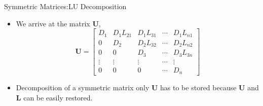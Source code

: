 \documentclass{beamer}
\begin{document}
\begin{frame}{Symmetric Matrices:LU Decomposition}
  \begin{itemize}
  \item We arrive at the matrix $\mathbf{U}$, 
$$
\mathbf{U}=\left[\begin{array}{ccccc}
D_1 & D_1 L_{21} & D_1 L_{31} & \cdots & D_1 L_{n 1} \\
0 & D_2 & D_2 L_{32} & \cdots & D_2 L_{n 2} \\
0 & 0 & D_3 & \cdots & D_3 L_{3 n} \\
\vdots & \vdots & \vdots & \cdots & \vdots \\
0 & 0 & 0 & \cdots & D_n
\end{array}\right]
$$
\item Decomposition of a symmetric matrix only $\mathbf{U}$ has to be stored because $\mathbf{U}$ and  $\mathbf{L}$ can be easily restored.
\end{itemize}
  \end{frame}
\end{document}
